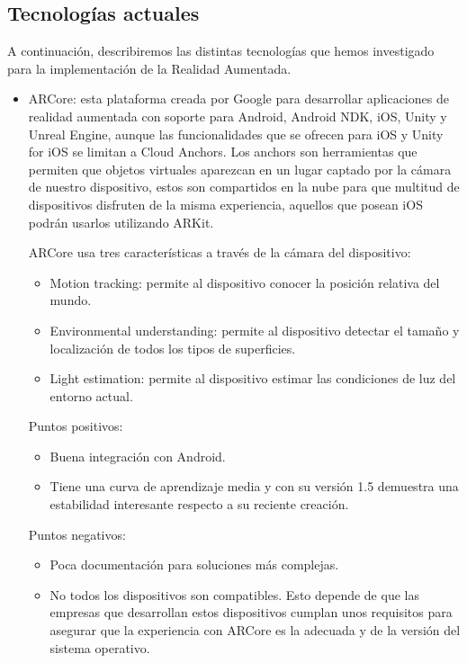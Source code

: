 \subsection{Tecnologías actuales}
\label{makereference2.1.1}
A continuación, describiremos las distintas tecnologías que hemos investigado
 para la implementación de la Realidad Aumentada.
\begin{itemize}
    \item ARCore\cite{arcore}: esta plataforma creada por Google para
    desarrollar aplicaciones de realidad aumentada con soporte para Android,
    Android NDK, iOS, Unity y Unreal Engine, aunque las funcionalidades que
    se ofrecen para iOS y Unity for iOS se limitan a Cloud Anchors.
    Los anchors son herramientas que permiten que objetos virtuales
    aparezcan en un lugar captado por la cámara de nuestro dispositivo,
    estos son compartidos en la nube para que multitud de dispositivos
    disfruten de la misma experiencia, aquellos que posean iOS podrán usarlos
    utilizando ARKit.

    ARCore usa tres características a través de la cámara del dispositivo:
    \begin{itemize}  
        \item Motion tracking: permite al dispositivo conocer la posición
        relativa del mundo.
        \item Environmental understanding: permite al dispositivo detectar el
        tamaño y localización de todos los tipos de superficies.
        \item Light estimation: permite al dispositivo estimar las condiciones
        de luz del entorno actual.
    \end{itemize}
    Puntos positivos:
    \begin{itemize}
        \item Buena integración con Android.
        \item Tiene una curva de aprendizaje media y con su versión 1.5
        demuestra una estabilidad interesante respecto a su reciente creación.
    \end{itemize}
    Puntos negativos:
    \begin{itemize}
        \item Poca documentación para soluciones más complejas.
        \item No todos los dispositivos son compatibles.
        Esto depende de que las empresas que desarrollan estos dispositivos
        cumplan unos requisitos para asegurar que la experiencia con ARCore
        es la adecuada y de la versión del sistema operativo.
    \end{itemize}


\end{itemize}
